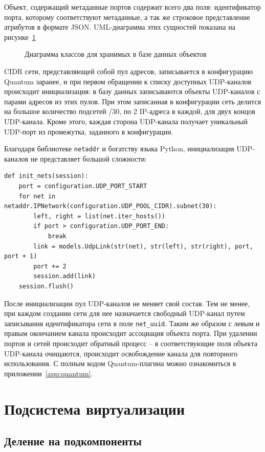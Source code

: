 Объект, содержащий метаданные портов содержит всего два поля: идентификатор порта,
которому соответствуют метаданные, а так же строковое представление атрибутов в формате
JSON. UML-диаграмма этих сущностей показана на рисунке~\ref{fig:quantum-models-uml}
\begin{figure}
  \centering
  {\footnotesize\tt}
  \caption{Диаграмма классов для хранимых в базе данных объектов}  
  \label{fig:quantum-models-uml}
\end{figure}

CIDR сети, представляющей собой пул адресов, 
записывается в конфигурацию Quantum заранее, и при первом обращении к списку доступных
UDP-каналов происходит инициализация: в базу данных записываются объекты UDP-каналов 
с парами адресов из этих пулов. 
При этом записанная в конфигурации сеть делится на большое количество подсетей /30, 
по 2 IP-адреса в каждой, для двух концов UDP-канала. Кроме этого, каждая сторона UDP-канала
получает уникальный UDP-порт из промежутка, заданного в конфигурации.

Благодаря библиотеке \verb`netaddr` и богатству языка Python, инициализация
UDP-каналов не представляет большой сложности:
\begin{lstlisting}
def init_nets(session):
    port = configuration.UDP_PORT_START
    for net in netaddr.IPNetwork(configuration.UDP_POOL_CIDR).subnet(30):
        left, right = list(net.iter_hosts())
        if port > configuration.UDP_PORT_END:
            break
        link = models.UdpLink(str(net), str(left), str(right), port, port + 1)
        port += 2
        session.add(link)
    session.flush()
\end{lstlisting}

После инициализации пул UDP-каналов не меняет свой состав. 
Тем не менее, при каждом создании сети для нее назначается свободный UDP-канал
путем записывания идентификатора сети в поле \verb`net_uuid`. Таким же образом с 
левым и правым окончанием канала происходит ассоциация объекта порта.
При удалении портов и сетей происходит обратный процесс -- в соответствующие поля 
объекта UDP-канала очищаются, происходит освобождение канала для повторного использования.
С полным кодом Quantum-плагина можно ознакомиться в приложении~\ref{app:quantum}.

\section{Подсистема виртуализации}

\subsection{Деление на подкомпоненты}

